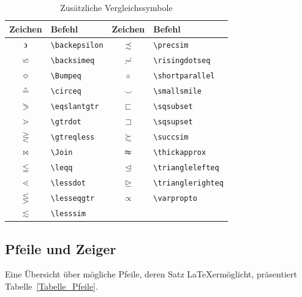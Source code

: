 \documentclass[a4paper,10pt,twoside]{scrbook}
\begin{document}
\begin{table}[h!tb]
\centering
\caption{Zusätzliche Vergleichssymbole}
\label{Tabelle_Zusaetzliche_Vergleichssymbole}       %
\begin{tabular}{clcl}
\hline
Zeichen & Befehl & Zeichen & Befehl  \\
\hline
$\backepsilon$ & \texttt{\textbackslash backepsilon} &
$\precsim$ & \texttt{\textbackslash precsim} \\
$\backsimeq$ & \texttt{\textbackslash backsimeq} &
$\risingdotseq$ & \texttt{\textbackslash risingdotseq} \\
$\Bumpeq$ & \texttt{\textbackslash Bumpeq} &
$\shortparallel$ & \texttt{\textbackslash shortparallel} \\
$\circeq$ & \texttt{\textbackslash circeq} &
$\smallsmile$ & \texttt{\textbackslash smallsmile} \\
$\eqslantgtr$ & \texttt{\textbackslash eqslantgtr} &
$\sqsubset$ & \texttt{\textbackslash sqsubset} \\
$\gtrdot$ & \texttt{\textbackslash gtrdot} &
$\sqsupset$ & \texttt{\textbackslash sqsupset} \\
$\gtreqless$ & \texttt{\textbackslash gtreqless} &
$\succsim$ & \texttt{\textbackslash succsim} \\
$\Join$ & \texttt{\textbackslash Join} &
$\thickapprox$ & \texttt{\textbackslash thickapprox} \\
$\leqq$ & \texttt{\textbackslash leqq} &
$\trianglelefteq$ & \texttt{\textbackslash trianglelefteq} \\
$\lessdot$ & \texttt{\textbackslash lessdot} &
$\trianglerighteq$ & \texttt{\textbackslash trianglerighteq} \\
$\lesseqgtr$ & \texttt{\textbackslash lesseqgtr} &
$\varpropto$ & \texttt{\textbackslash varpropto} \\
$\lesssim$ & \texttt{\textbackslash lesssim} & & \\
\hline
\end{tabular}
\end{table}


\subsection{Pfeile und Zeiger}


Eine Übersicht über mögliche Pfeile, deren Satz \LaTeX ermöglicht, präsentiert Tabelle~\ref{Tabelle_Pfeile}.
\end{document}
